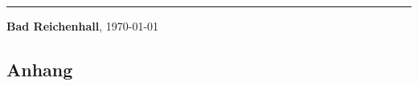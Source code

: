 \documentclass{article}
\begin{document}
\vspace{20mm}
\hrule
\vspace{5mm}
\begin{center}
\textbf{Bad Reichenhall}, \today
\end{center}


\newpage


\newpage


\newpage
{}
\small 						%


\newpage

\begin{appendix}
\section*{Anhang}
\end{appendix}
\end{document}
